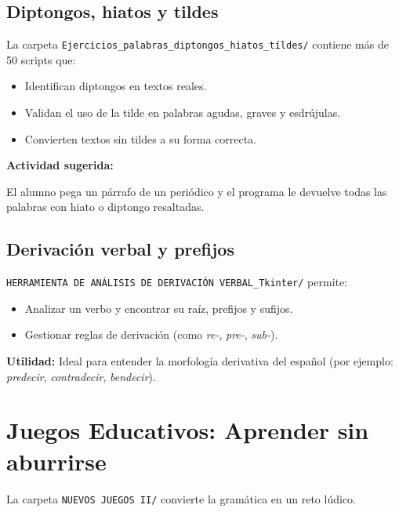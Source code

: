 \documentclass[12pt,spanish]{article}
\begin{document}
\subsection{Diptongos, hiatos y tildes}

La carpeta \texttt{Ejercicios\_palabras\_diptongos\_hiatos\_tíldes/} contiene más de 50 scripts que:

\begin{itemize}
    \item Identifican diptongos en textos reales.
    \item Validan el uso de la tilde en palabras agudas, graves y esdrújulas.
    \item Convierten textos sin tildes a su forma correcta.
\end{itemize}

\begin{ejemplo}
\textbf{Actividad sugerida:}

El alumno pega un párrafo de un periódico y el programa le devuelve todas las palabras con hiato o diptongo resaltadas.
\end{ejemplo}

\subsection{Derivación verbal y prefijos}

\texttt{HERRAMIENTA DE ANÁLISIS DE DERIVACIÓN VERBAL\_Tkinter/} permite:

\begin{itemize}
    \item Analizar un verbo y encontrar su raíz, prefijos y sufijos.
    \item Gestionar reglas de derivación (como \textit{re-}, \textit{pre-}, \textit{sub-}).
\end{itemize}

\begin{nota}
\textbf{Utilidad:} Ideal para entender la morfología derivativa del español (por ejemplo: \textit{predecir}, \textit{contradecir}, \textit{bendecir}).
\end{nota}

\section{Juegos Educativos: Aprender sin aburrirse}

La carpeta \texttt{NUEVOS JUEGOS II/} convierte la gramática en un reto lúdico.
\end{document}
